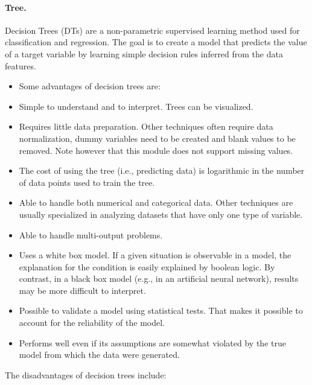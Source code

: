 \paragraph{Tree.}
\label{tree}
Decision Trees (DTs) are a non-parametric supervised learning method used for
classification and regression.
%
The goal is to create a model that predicts the value of a target variable by
learning simple decision rules inferred from the data features.
%
\begin{itemize}
  \item Some advantages of decision trees are:
  \item Simple to understand and to interpret.
  Trees can be visualized.
  \item Requires little data preparation.
  Other techniques often require data normalization, dummy variables need to be
  created and blank values to be removed.
  Note however that this module does not support missing values.
  \item The cost of using the tree (i.e., predicting data) is logarithmic in the
  number of data points used to train the tree.
  \item Able to handle both numerical and categorical data.
  Other techniques are usually specialized in analyzing datasets that have only
  one type of variable.
  \item Able to handle multi-output problems.
  \item Uses a white box model.
  If a given situation is observable in a model, the explanation for the
  condition is easily explained by boolean logic.
  By contrast, in a black box model (e.g., in an artificial neural network),
  results may be more difficult to interpret.
  \item Possible to validate a model using statistical tests.
  That makes it possible to account for the reliability of the model.
  \item Performs well even if its assumptions are somewhat violated by the true
  model from which the data were generated.
\end{itemize}
The disadvantages of decision trees include:
